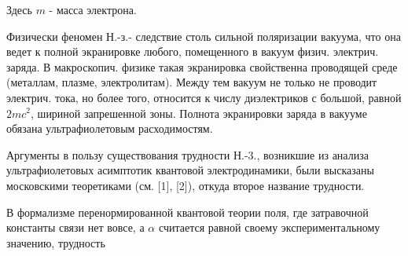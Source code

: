 \documentclass[10pt]{article}
\begin{document}
Здесь $m$ - масса электрона.



Физически феномен Н.-з.- следствие столь сильной поляризации вакуума, что она ведет к полной экранировке любого, помещенного в вакуум физич. электрич. заряда. В макроскопич. физике такая экранировка свойственна проводящей среде (металлам, плазме, электролитам). Между тем вакуум не только не проводит электрич. тока, но более того, относится к числу диэлектриков с большой, равной $2 m c^{2}$, шириной запрешенной зоны. Полнота экранировки заряда в вакууме обязана ультрафиолетовым расходимостям.



Аргументы в пользу существования трудности Н.-3., возникшие из анализа ультрафиолетовых асимптотик квантовой электродинамики, были высказаны московскими теоретиками (см. [1], [2]), откуда второе название трудности.



В формализме перенормированной квантовой теории поля, где затравочной константы связи нет вовсе, а $\alpha$ считается равной своему экспериментальному значению, трудность
\end{document}
